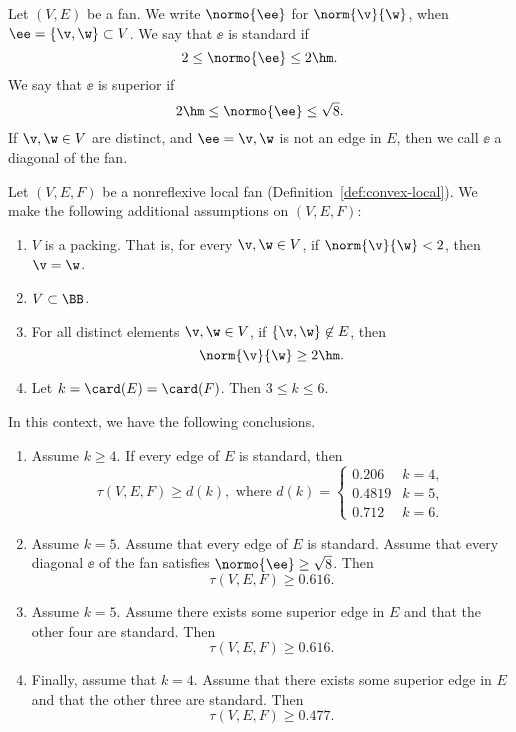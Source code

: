 \begin{definition} Let $(V,E)$ be a fan.  
We write $\normo{\ee}$ for $\norm{\v}{\w}$, when $\ee=\{\v,\w\}\subset V$.
We say that  $\ee$ is standard if
\[
2\le \normo{\ee}\le2\hm.
\]
We say that  $\ee$ is superior if
\[
2\hm\le \normo{\ee}\le\sqrt{8}.
\]
If $\v,\w\in V$ are distinct, and $\ee={\v,\w}$ is not an edge in $E$, then
we call $\ee$ a diagonal of the fan.
\end{definition}


\begin{theorem}
Let $(V,E,F)$ be a nonreflexive local fan (Definition~\ref{def:convex-local}).
We make the following additional
assumptions on $(V,E,F)$:
\begin{enumerate}
\item {} $V$ is a packing.  That is, for every $\v,\w\in
V$, if $\norm{\v}{\w}<2$, then $\v=\w$.
\item {} $V\subset \BB$.
\item {} For all distinct elements $\v,\w\in V$, if
$\{\v,\w\}\not\in E$, then 
\[ 
\norm{\v}{\w}\ge 2\hm.
\] 
\item {} %
Let   $k=\card(E)=\card(F)$.  Then $3\le k \le 6$.
\end{enumerate}
\label{lemma:empty-d}
In this context, we have the following conclusions.
\begin{enumerate}
\item Assume $k\ge 4$.  If  every edge of $E$ is standard, then
\[ 
\tau(V,E,F) \ge d (k), \text{ where } d(k) =
\begin{cases}
  0.206&k=4,\\
  0.4819&k=5,\\
  0.712&k=6.
\end{cases}
\] 
\item Assume $k=5$.  Assume that every edge of $E$ is standard.
Assume that every diagonal $\ee$ of the fan satisfies $\normo{\ee}\ge\sqrt{8}$.
Then 
\[
\tau(V,E,F)\ge 0.616.
\]
\item Assume $k=5$.  Assume there exists some superior edge in $E$ 
and that the other four are standard.  Then 
\[
\tau(V,E,F)\ge 0.616.
\]
\item Finally, assume that $k=4$.  Assume that there exists some superior
 edge in $E$ and that the other three are standard.  Then
\[
\tau(V,E,F)\ge 0.477.
\]
\end{enumerate}
\end{theorem}

